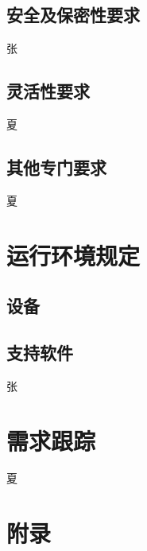 \documentclass[UTF8]{ctexart}
\begin{document}
\subsection{安全及保密性要求}
张
\subsection{灵活性要求}
夏
\subsection{其他专门要求}
夏
\section{运行环境规定}
\subsection{设备}

\subsection{支持软件}
张
\section{需求跟踪}
夏
\section{附录}
\end{document}
